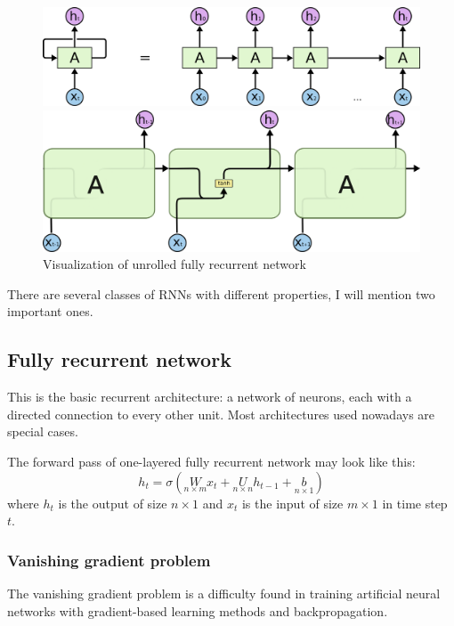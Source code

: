 \begin{figure}
\includegraphics[width=.9\textwidth]{images/supervised/RNN-unrolled.png}
\vspace{.5cm}

\includegraphics[width=.9\textwidth]{images/supervised/rnn2.png}
\caption{Visualization of unrolled fully recurrent network\protect\footnotemark}
\end{figure}
There are several classes of RNNs with different properties, I will mention two important ones.

\subsection{Fully recurrent network} This is the basic recurrent architecture: a network of neurons, each with a directed connection to every other unit. Most architectures used nowadays are special cases.

The forward pass of one-layered fully recurrent network may look like this:
\begin{equation}
h_t=\sigma \left(\underset{n\times m}{W}x_t+\underset{n\times n}{U}h_{t-1}+\underset{n\times 1}{b}\right)
\end{equation}
where $h_t$ is the output of size $n \times 1$ and $x_t$ is the input of size $m \times 1$ in time step $t$.

\subsubsection{Vanishing gradient problem}

The vanishing gradient problem is a difficulty found in training artificial neural networks with gradient-based learning methods and backpropagation. 

